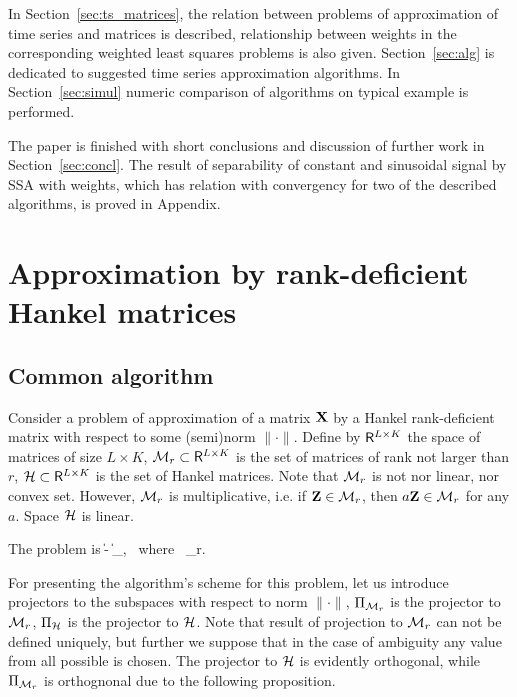 \documentclass[12pt,a4paper,fleqn,leqno]{article}
\begin{document}
In Section~\ref{sec:ts_matrices}, the relation between problems of approximation of time series and matrices is described, relationship between weights in the corresponding weighted least squares problems is also given. Section~\ref{sec:alg} is dedicated to suggested time series approximation algorithms. In Section~\ref{sec:simul} numeric comparison of algorithms on typical example is performed.

The paper is finished with short conclusions and discussion of further work in Section~\ref{sec:concl}. The result of separability of constant and sinusoidal signal by SSA with weights, which has relation with convergency for two of the described algorithms, is proved in Appendix.

\section{Approximation by rank-deficient Hankel matrices}
\label{sec:lowrank_appr}
\subsection{Common algorithm}
Consider a problem of approximation of a matrix $\mathbf{X}$ by a Hankel rank-deficient matrix with respect to some (semi)norm $\|\cdot\|$. Define by $\mathsf{R}^{L\times K}$ the space of matrices of size $L \times K$, $\mathcal{M}_r\subset \mathsf{R}^{L\times K}$ is the set of matrices of rank not larger than $r$,
$\mathcal{H} \subset \mathsf{R}^{L\times K}$ is the set of Hankel matrices.
Note that  $\mathcal{M}_r$ is not nor linear, nor convex set. However, $\mathcal{M}_r$ is multiplicative, i.e.
if $\mathbf{Z}\in \mathcal{M}_r$, then $a\mathbf{Z}\in \mathcal{M}_r$ for any $a$.
Space $\mathcal{H}$ is linear.

The problem is
\be
\label{eq:gen_task}
\|\bfX - \bfY\| \to \min_\bfY, \mbox{\ where\ } \bfY \in \calH \cap \calM_r.
\ee

For presenting the algorithm's scheme for this problem, let us introduce projectors to the subspaces with respect to norm $\|\cdot\|$, $\Pi_{\mathcal{M}_r}$ is the projector to $\mathcal{M}_r$,
$\Pi_{\mathcal{H}}$ is the projector to $\mathcal{H}$.
Note that result of projection to $\mathcal{M}_r$ can not be defined uniquely, but further we suppose that in the case of ambiguity any value from all possible is chosen. The projector to $\mathcal{H}$ is evidently orthogonal, while $\Pi_{\mathcal{M}_r}$ is orthognonal due to the following proposition.
\end{document}
